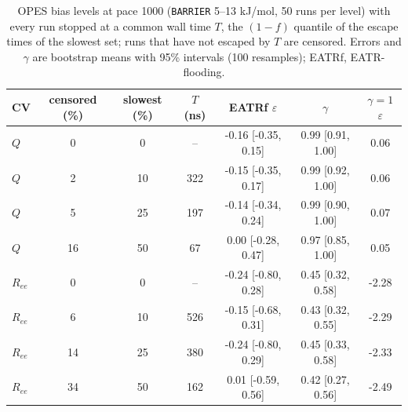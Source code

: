 \begin{table}[H]\centering
\caption{OPES bias levels at pace 1000 (\texttt{BARRIER} 5--13 kJ/mol, 50 runs per level) with every run stopped at a common wall time $T$, the $(1-f)$ quantile of the escape times of the slowest set; runs that have not escaped by $T$ are censored. Errors and $\gamma$ are bootstrap means with 95\% intervals (100 resamples); EATRf, EATR-flooding.}\label{tab:s12}
\begin{tabular}{lcccccc}\toprule
CV & censored (\%) & slowest (\%) & $T$ (ns) & EATRf $\varepsilon$ & $\gamma$ & $\gamma = 1$ $\varepsilon$\\ \midrule
$Q$ & 0 & 0 & -- & -0.16 [-0.35, 0.15] & 0.99 [0.91, 1.00] & 0.06 \\
$Q$ & 2 & 10 & 322 & -0.15 [-0.35, 0.17] & 0.99 [0.92, 1.00] & 0.06 \\
$Q$ & 5 & 25 & 197 & -0.14 [-0.34, 0.24] & 0.99 [0.90, 1.00] & 0.07 \\
$Q$ & 16 & 50 & 67 & 0.00 [-0.28, 0.47] & 0.97 [0.85, 1.00] & 0.05 \\
$R_{ee}$ & 0 & 0 & -- & -0.24 [-0.80, 0.28] & 0.45 [0.32, 0.58] & -2.28 \\
$R_{ee}$ & 6 & 10 & 526 & -0.15 [-0.68, 0.31] & 0.43 [0.32, 0.55] & -2.29 \\
$R_{ee}$ & 14 & 25 & 380 & -0.24 [-0.80, 0.29] & 0.45 [0.33, 0.58] & -2.33 \\
$R_{ee}$ & 34 & 50 & 162 & 0.01 [-0.59, 0.56] & 0.42 [0.27, 0.56] & -2.49\\ \bottomrule
\end{tabular}
\end{table}
